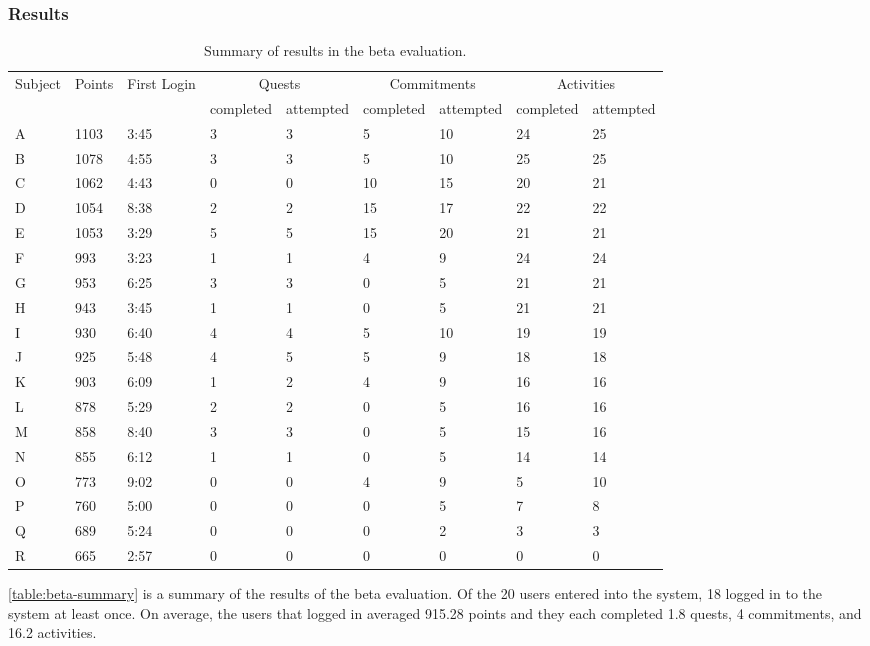 \subsubsection{Results}

\begin{table}[t]
	\begin{tabular}{| l || l | l | l | l | l | l | l | l |}
		\hline
		Subject & Points & First Login & \multicolumn{2}{c}{Quests} & \multicolumn{2}{c}{Commitments} & \multicolumn{2}{c|}{Activities} \\
		& & & completed & attempted & completed & attempted & completed & attempted \\
		\hline
    A & 1103 & 3:45 & 3 & 3 & 5 & 10 & 24 & 25 \\
    B & 1078 & 4:55 & 3 & 3 & 5 & 10 & 25 & 25 \\
    C & 1062 & 4:43 & 0 & 0 & 10 & 15 & 20 & 21 \\
    D & 1054 & 8:38 & 2 & 2 & 15 & 17 & 22 & 22 \\
    E & 1053 & 3:29 & 5 & 5 & 15 & 20 & 21 & 21 \\
    F & 993 & 3:23 & 1 & 1 & 4 & 9 & 24 & 24 \\
    G & 953 & 6:25 & 3 & 3 & 0 & 5 & 21 & 21 \\
    H & 943 & 3:45 & 1 & 1 & 0 & 5 & 21 & 21 \\
    I & 930 & 6:40 & 4 & 4 & 5 & 10 & 19 & 19 \\
    J & 925 & 5:48 & 4 & 5 & 5 & 9 & 18 & 18 \\
    K & 903 & 6:09 & 1 & 2 & 4 & 9 & 16 & 16 \\
    L & 878 & 5:29 & 2 & 2 & 0 & 5 & 16 & 16 \\
    M & 858 & 8:40 & 3 & 3 & 0 & 5 & 15 & 16 \\
    N & 855 & 6:12 & 1 & 1 & 0 & 5 & 14 & 14 \\
    O & 773 & 9:02 & 0 & 0 & 4 & 9 & 5 & 10 \\
    P & 760 & 5:00 & 0 & 0 & 0 & 5 & 7 & 8 \\
    Q & 689 & 5:24 & 0 & 0 & 0 & 2 & 3 & 3 \\
    R & 665 & 2:57 & 0 & 0 & 0 & 0 & 0 & 0 \\
		\hline
	\end{tabular}
	\caption{Summary of results in the beta evaluation.}
	\label{table:beta-summary}
\end{table}

\autoref{table:beta-summary} is a summary of the results of the beta evaluation. Of the 20 users entered into the system, 18 logged in to the system at least once. On average, the users that logged in averaged 915.28 points and they each completed 1.8 quests, 4 commitments, and 16.2 activities.


